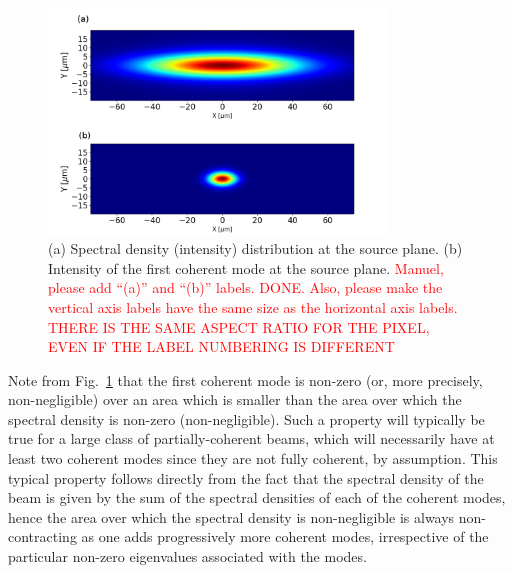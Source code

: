 \documentclass[%
 reprint,
 amsmath,amssymb,
 aps,
]{revtex4-1}
\begin{document}
\begin{figure}%
\includegraphics[width=9.0cm]{Figures/spectral_density.png}
\caption{(a) Spectral density (intensity) distribution at the source plane. (b) Intensity of the first coherent mode at the source plane. \textcolor{red}{Manuel, please add ``(a)'' and ``(b)'' labels. DONE.  Also, please make the vertical axis labels have the same size as the horizontal axis labels. THERE IS THE SAME ASPECT RATIO FOR THE PIXEL, EVEN IF THE LABEL NUMBERING IS DIFFERENT}}
\label{spectral_density}
\end{figure}

Note from Fig.~\ref{spectral_density} that the first coherent mode is non-zero (or, more precisely, non-negligible) over an area which is smaller than the area over which the spectral density is non-zero (non-negligible). Such a property will typically be true for a large class of partially-coherent beams, which will necessarily have at least two coherent modes since they are not fully coherent, by assumption.  This typical property follows directly from the fact that the spectral density of the beam is given by the sum of the spectral densities of each of the coherent modes, hence the area over which the spectral density is non-negligible is always non-contracting as one adds progressively more coherent modes, irrespective of the particular non-zero eigenvalues associated with the modes.  
\end{document}
